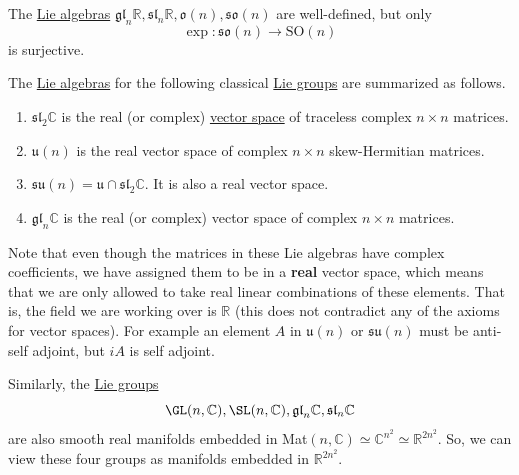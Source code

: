   \begin{theorem}
    \label{thm:well-definedness-of-the-classical-real-lie}
    The \hyperref[def:lie-algebra]{Lie algebras} $\mathfrak{gl}_n \mathbb{R}, \mathfrak{sl}_n \mathbb{R}, \mathfrak{o}(n), \mathfrak{so}(n)$ are well-defined, but only 
    \begin{equation}
      \exp: \mathfrak{so}(n) \rightarrow \text{SO}(n)
    \end{equation}
    is surjective. 
  \end{theorem}

  \begin{theorem}
    \label{thm:real-forms-of-mathfraksl2c}
    The \hyperref[def:lie-algebra]{Lie algebras} for the following classical \hyperref[def:lie-group]{Lie groups} are summarized as follows. 
    \begin{enumerate}
      \item $\mathfrak{sl}_2 \mathbb{C}$ is the real (or complex) \hyperref[def:vector-space]{vector space} of traceless complex $n \times n$ matrices. 
      \item $\mathfrak{u}(n)$ is the real vector space of complex $n \times n$ skew-Hermitian matrices. 
      \item $\mathfrak{su}(n) = \mathfrak{u} \cap \mathfrak{sl}_2 \mathbb{C}$. It is also a real vector space. 
      \item $\mathfrak{gl}_n \mathbb{C}$ is the real (or complex) vector space of complex $n \times n$ matrices. 
    \end{enumerate}
    Note that even though the matrices in these Lie algebras have complex coefficients, we have assigned them to be in a \textbf{real} vector space, which means that we are only allowed to take real linear combinations of these elements. That is, the field we are working over is $\mathbb{R}$ (this does not contradict any of the axioms for vector spaces). For example an element $A$ in $\mathfrak{u}(n)$ or $\mathfrak{su}(n)$ must be anti-self adjoint, but $iA$ is self adjoint. 
  \end{theorem}

  Similarly, the \hyperref[def:lie-group]{Lie groups} 
  \begin{equation}
    \GL(n, \mathbb{C}), \SL(n, \mathbb{C}), \mathfrak{gl}_n \mathbb{C}, \mathfrak{sl}_n \mathbb{C}
  \end{equation}
  are also smooth real manifolds embedded in Mat$(n, \mathbb{C}) \simeq \mathbb{C}^{n^2} \simeq \mathbb{R}^{2 n^2}$. So, we can view these four groups as manifolds embedded in $\mathbb{R}^{2 n^2}$. 

